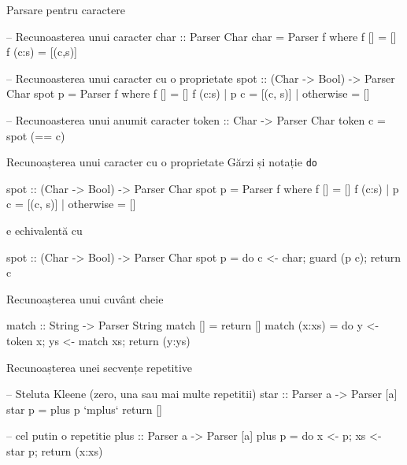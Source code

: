 \documentclass[xcolor=pdftex,romanian,colorlinks]{beamer}
\begin{document}
%

\begin{frame}[fragile]{Parsare pentru caractere}
\begin{asciihs}
  -- Recunoasterea unui caracter
  char :: Parser Char
  char = Parser f
    where
    f []     = []
    f (c:s) = [(c,s)]

  -- Recunoasterea unui caracter cu o proprietate
  spot :: (Char -> Bool) -> Parser Char
  spot p = Parser f
    where
    f []                 = []
    f (c:s) | p c        = [(c, s)]
            | otherwise = []

  -- Recunoasterea unui anumit caracter
  token :: Char -> Parser Char
  token c = spot (== c)
\end{asciihs}
\end{frame}




\begin{frame}[fragile]{Recunoașterea unui caracter cu o proprietate}
{Gărzi și notație \lstinline$do$}
\begin{asciihs}
  spot :: (Char -> Bool) -> Parser Char
  spot p = Parser f
    where
    f []                 = []
    f (c:s) | p c        = [(c, s)]
            | otherwise = []
\end{asciihs}
e echivalentă cu
\begin{asciihs}
  spot :: (Char -> Bool) -> Parser Char
  spot p = do { c <- char; guard (p c); return c }
\end{asciihs}
\end{frame}

\begin{frame}[fragile]{Recunoașterea unui cuvânt cheie}
\begin{asciihs}
  match :: String -> Parser String
  match []      = return []
  match (x:xs) = do
                     y <- token x;
                     ys <- match xs;
                     return (y:ys)
\end{asciihs}
\end{frame}



\begin{frame}[fragile]{Recunoașterea unei secvențe repetitive}
\begin{asciihs}
  -- Steluta Kleene (zero, una sau mai multe repetitii)
  star :: Parser a -> Parser [a]
  star p = plus p `mplus` return []

  -- cel putin o repetitie
  plus :: Parser a -> Parser [a]
  plus p = do { x <- p;
                xs <- star p;
                return (x:xs) }
\end{asciihs}
\end{frame}
\end{document}
